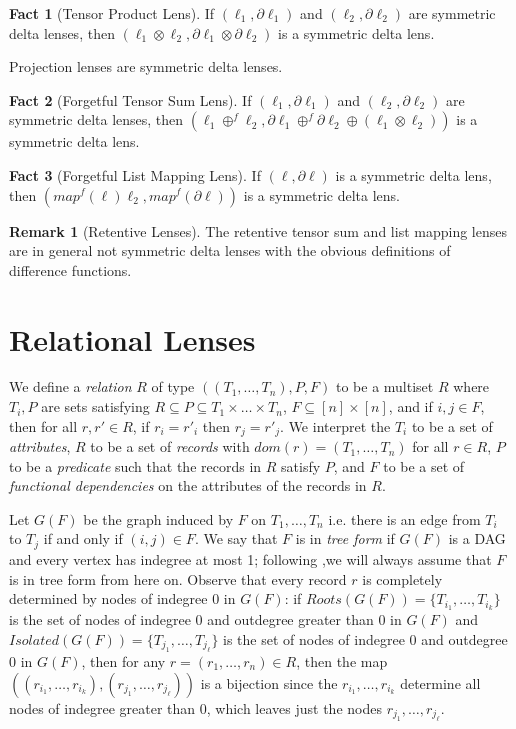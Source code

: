 \documentclass[acmsmall,review,anonymous]{acmart}\settopmatter{printfolios=true,printccs=false,printacmref=false}
\theoremstyle{definition}
\newtheorem{fact}{Fact}
\newtheorem{remark}{Remark}
\begin{document}
\begin{fact}[Tensor Product Lens]
If $(\ell_1, \partial \ell_1)$ and $(\ell_2, \partial \ell_2)$ are symmetric
delta lenses, then $(\ell_1 \otimes \ell_2, \partial \ell_1 \otimes \partial
\ell_2)$ is a symmetric delta lens.
\end{fact}
\begin{corollary}
Projection lenses are symmetric delta lenses.
\end{corollary}
\begin{fact}[Forgetful Tensor Sum Lens]
If $(\ell_1, \partial \ell_1)$ and $(\ell_2, \partial \ell_2)$ are symmetric
delta lenses, then $(\ell_1 \oplus^f \ell_2, \partial \ell_1 \oplus^f \partial
\ell_2 \oplus (\ell_1 \otimes \ell_2))$ is a symmetric delta lens.
\end{fact}
\begin{fact}[Forgetful List Mapping Lens]
If $(\ell, \partial \ell)$ is a symmetric delta lens, then $(map^f(\ell)
\ell_2, map^f(\partial \ell))$ is a symmetric delta lens.
\end{fact}
\begin{remark}[Retentive Lenses]
The retentive tensor sum and list mapping lenses are in general not symmetric
delta lenses with the obvious definitions of difference functions.
\end{remark}
\fi
\section{Relational Lenses}
We define a {\em relation} $R$ of type $((T_1, \ldots, T_n), P, F)$ to be a
multiset $R$ where $T_i, P$ are sets satisfying $R \subseteq P \subseteq T_1
\times \ldots \times T_n$, $F \subseteq [n] \times [n]$, and if $i, j \in F$,
then for all $r, r' \in R$, if $r_i = r'_i$ then $r_j = r'_j$. We interpret the
$T_i$ to be a set of {\em attributes}, $R$ to be a set of {\em records} with
$dom(r) = (T_1, \ldots, T_n)$ for all $r \in R$, $P$ to be a {\em predicate}
such that the records in $R$ satisfy $P$, and $F$ to be a set of {\em
functional dependencies} on the attributes of the records in $R$.

Let $G(F)$ be the graph induced by $F$ on $T_1, \ldots, T_n$ i.e. there is an
edge from $T_i$ to $T_j$ if and only if $(i, j) \in F$. We say that $F$ is
in {\em tree form} if $G(F)$ is a DAG and every vertex has indegree at most 1;
following \cite{bohannon2006relational},we will always assume that $F$ is in
tree form from here on. Observe that every record $r$ is completely determined
by nodes of indegree 0 in $G(F)$: if $Roots(G(F)) = \{T_{i_1}, \ldots,
T_{i_k}\}$ is the set of nodes of indegree 0 and outdegree greater than 0 in
$G(F)$ and $Isolated(G(F)) = \{T_{j_1}, \ldots, T_{j_\ell}\}$ is the set of
nodes of indegree 0 and outdegree 0 in $G(F)$, then for any $r = (r_1, \ldots,
r_n)\in R$, then the map $((r_{i_1}, \ldots, r_{i_k}), (r_{j_1}, \ldots,
r_{j_\ell}))$ is a bijection since the $r_{i_1}, \ldots, r_{i_k}$ determine all
nodes of indegree greater than 0, which leaves just the nodes $r_{j_1}, \ldots,
r_{j_\ell}$.
\end{document}
